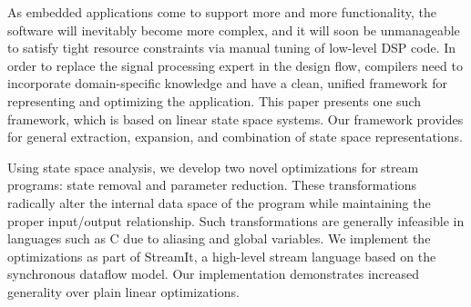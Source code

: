 \label{sec:conclusion}

As embedded applications come to support more and more functionality,
the software will inevitably become more complex, and it will soon be
unmanageable to satisfy tight resource constraints via manual tuning
of low-level DSP code.  In order to replace the signal processing
expert in the design flow, compilers need to incorporate
domain-specific knowledge and have a clean, unified framework for
representing and optimizing the application.  This paper presents one
such framework, which is based on linear state space systems.  Our
framework provides for general extraction, expansion, and combination
of state space representations.

Using state space analysis, we develop two novel optimizations for
stream programs: state removal and parameter reduction.  These
transformations radically alter the internal data space of the program
while maintaining the proper input/output relationship.  Such
transformations are generally infeasible in languages such as C due to
aliasing and global variables.  We implement the optimizations as part
of StreamIt, a high-level stream language based on the synchronous
dataflow model.  Our implementation demonstrates increased generality
over plain linear optimizations.
